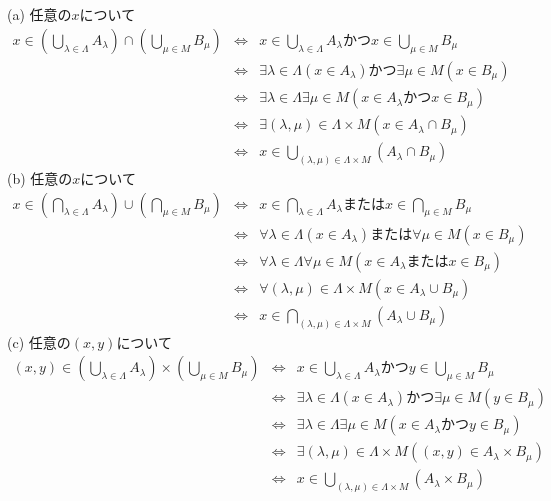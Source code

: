 \documentclass{jsarticle}
\begin{document}
\subsection{} %
\noindent
(a) 任意の$x$について
\begin{eqnarray*}
	x \in \left(\bigcup_{\lambda \in \Lambda}A_\lambda\right) \cap \left(\bigcup_{\mu \in M}B_\mu\right)
	&\Leftrightarrow& x \in \bigcup_{\lambda \in \Lambda}A_\lambda かつ x \in \bigcup_{\mu \in M}B_\mu\\
	&\Leftrightarrow& \exists{\lambda \in \Lambda}(x \in A_\lambda) かつ \exists{\mu \in M}(x \in B_\mu)\\
	&\Leftrightarrow& \exists{\lambda \in \Lambda}\exists{\mu \in M}(x \in A_\lambda かつ x \in B_\mu)\\
	&\Leftrightarrow& \exists{(\lambda, \mu) \in \Lambda \times M}(x \in A_\lambda \cap B_\mu)\\
	&\Leftrightarrow& x \in \bigcup_{(\lambda, \mu) \in \Lambda \times M}(A_\lambda \cap B_\mu)
\end{eqnarray*}
(b) 任意の$x$について
\begin{eqnarray*}
	x \in \left(\bigcap_{\lambda \in \Lambda}A_\lambda\right) \cup \left(\bigcap_{\mu \in M}B_\mu\right)
	&\Leftrightarrow& x \in \bigcap_{\lambda \in \Lambda}A_\lambda または x \in \bigcap_{\mu \in M}B_\mu\\
	&\Leftrightarrow& \forall{\lambda \in \Lambda}(x \in A_\lambda) または \forall{\mu \in M}(x \in B_\mu)\\
	&\Leftrightarrow& \forall{\lambda \in \Lambda}\forall{\mu \in M}(x \in A_\lambda または x \in B_\mu)\\
	&\Leftrightarrow& \forall{(\lambda, \mu) \in \Lambda \times M}(x \in A_\lambda \cup B_\mu)\\
	&\Leftrightarrow& x \in \bigcap_{(\lambda, \mu) \in \Lambda \times M}(A_\lambda \cup B_\mu)
\end{eqnarray*}
(c) 任意の$(x, y)$について
\begin{eqnarray*}
	(x, y) \in \left(\bigcup_{\lambda \in \Lambda}A_\lambda\right) \times \left(\bigcup_{\mu \in M}B_\mu\right)
	&\Leftrightarrow& x \in \bigcup_{\lambda \in \Lambda}A_\lambda かつ y \in \bigcup_{\mu \in M}B_\mu\\
	&\Leftrightarrow& \exists{\lambda \in \Lambda}(x \in A_\lambda) かつ \exists{\mu \in M}(y \in B_\mu)\\
	&\Leftrightarrow& \exists{\lambda \in \Lambda}\exists{\mu \in M}(x \in A_\lambda かつ y \in B_\mu)\\
	&\Leftrightarrow& \exists{(\lambda, \mu) \in \Lambda \times M}((x, y) \in A_\lambda \times B_\mu)\\
	&\Leftrightarrow& x \in \bigcup_{(\lambda, \mu) \in \Lambda \times M}(A_\lambda \times B_\mu)
\end{eqnarray*}
\end{document}
